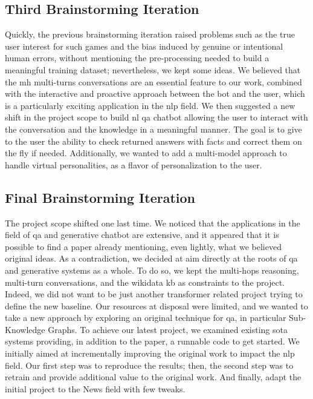 \subsection{Third Brainstorming Iteration}
Quickly, the previous brainstorming iteration raised problems such as the true user interest for such games and the bias induced by genuine or intentional human errors, without mentioning the pre-processing needed to build a meaningful training dataset; nevertheless, we kept some ideas. We believed that the \gls{mh} multi-turns conversations are an essential feature to our work, combined with the interactive and proactive approach between the bot and the user, which is a particularly exciting application in the \gls{nlp} field. We then suggested a new shift in the project scope to build \gls{nl} \gls{qa} chatbot allowing the user to interact with the conversation and the knowledge in a meaningful manner. The goal is to give to the user the ability to check returned answers with facts and correct them on the fly if needed. Additionally, we wanted to add a multi-model approach to handle virtual personalities, as a flavor of personalization to the user.


\subsection{Final Brainstorming Iteration}
The project scope shifted one last time. We noticed that the applications in the field of \gls{qa} and \gls{generative} chatbot are extensive, and it appeared that it is possible to find a paper already mentioning, even lightly, what we believed original ideas. As a contradiction, we decided at aim directly at the roots of \gls{qa} and \gls{generative} systems as a whole. To do so, we kept the multi-hops reasoning, multi-turn conversations, and the \gls{wikidata} \gls{kb} as constraints to the project. Indeed, we did not want to be just another \gls{transformer} related project trying to define the new baseline. Our resources at disposal were limited, and we wanted to take a new approach by exploring an original technique for \gls{qa}, in particular Sub-Knowledge Graphs. To achieve our latest project, we examined existing \gls{sota} systems providing, in addition to the paper, a runnable code to get started. We initially aimed at incrementally improving the original work to impact the \gls{nlp} field. Our first step was to reproduce the results; then, the second step was to retrain and provide additional value to the original work. And finally, adapt the initial project to the News field with few tweaks. 

